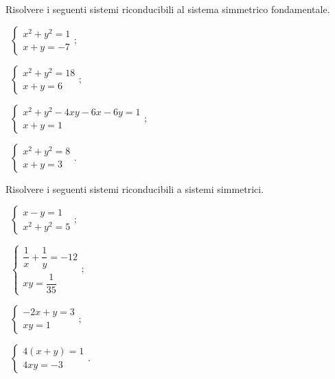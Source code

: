 \begin{esercizio}[\Ast]
\label{ese:6.32}
Risolvere i seguenti sistemi riconducibili al sistema simmetrico fondamentale.
\begin{multicols}{2}
 \begin{enumeratea}
 \item~$\left\{\begin{array}{l}x^2+y^2=1\\x+y=-7\end{array}\right.$;
 \item~$\left\{\begin{array}{l}x^2+y^2=18\\x+y=6 \end{array}\right.$;
 \item~$\left\{\begin{array}{l}x^2+y^2-4xy-6x-6y=1\\x+y=1 \end{array}\right.$;
 \item~$\left\{\begin{array}{l}x^2+y^2=8\\x+y=3\end{array}\right.$.
 \end{enumeratea}
 \end{multicols}
\end{esercizio}

\begin{esercizio}[\Ast]
\label{ese:6.33}
Risolvere i seguenti sistemi riconducibili a sistemi simmetrici.
\begin{multicols}{2}
 \begin{enumeratea}
 \item~$\left\{\begin{array}{l}{x-y=1}\\{x^2+y^2=5}\end{array}\right.$;
 \item~$\left\{\begin{array}{l}{\dfrac 1 x+\dfrac 1 y=-12}\\{{xy}=\dfrac 1{35}}\end{array}\right.$;
 \item~$\left\{\begin{array}{l}{-2x+y=3}\\{{xy}=1}\end{array}\right.$;
 \item~$\left\{\begin{array}{l}{4(x+y)=1}\\4xy=-3\end{array}\right.$.
 \end{enumeratea}
 \end{multicols}
\end{esercizio}

